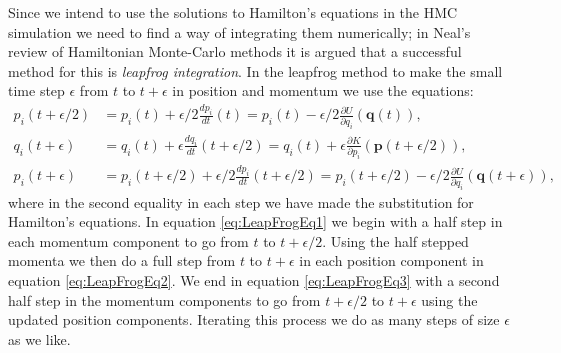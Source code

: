 \documentclass[12pt]{article}
\begin{document}
            Since we intend to use the solutions to Hamilton's equations in the HMC simulation we need to find a way of integrating them numerically; in Neal's review of Hamiltonian Monte-Carlo methods \cite{neal_2011} it is argued that a successful method for this is \textit{leapfrog integration}. In the leapfrog method to make the small time step $\epsilon$ from $t$ to $t+\epsilon$ in position and momentum we use the equations:
            \begin{align}
                \label{eq:LeapFrogEq1} p_i\left(t+\epsilon/2\right) & = p_i\left(t\right) + \epsilon/2\frac{dp_i}{dt}\left(t\right) = p_i\left(t\right) - \epsilon/2\frac{\partial U}{\partial q_i}\left(\bm{q}\left(t\right)\right), \\
                \label{eq:LeapFrogEq2}q_i\left(t+\epsilon\right) & = q_i\left(t\right) + \epsilon\frac{dq_i}{dt}\left(t+\epsilon/2\right) = q_i\left(t\right) + \epsilon\frac{\partial K}{\partial p_i}\left(\bm{p}\left(t+\epsilon/2\right)\right), \\
                \label{eq:LeapFrogEq3}p_i\left(t+\epsilon\right) & = p_i\left(t+\epsilon/2\right) + \epsilon/2\frac{dp_i}{dt}\left(t+\epsilon/2\right) = p_i\left(t+\epsilon/2\right) - \epsilon/2\frac{\partial U}{\partial q_i}\left(\bm{q}\left(t+\epsilon\right)\right),
            \end{align}
            where in the second equality in each step we have made the substitution for Hamilton's equations.
            In equation \ref{eq:LeapFrogEq1} we begin with a half step in each momentum component to go from $t$ to $t+\epsilon/2$. Using the half stepped momenta we then do a full step from $t$ to $t+\epsilon$ in each position component in equation \ref{eq:LeapFrogEq2}. We end in equation \ref{eq:LeapFrogEq3} with a second half step in the momentum components to go from $t+\epsilon/2$ to $t+\epsilon$ using the updated position components. Iterating this process we do as many steps of size $\epsilon$ as we like.
\end{document}
